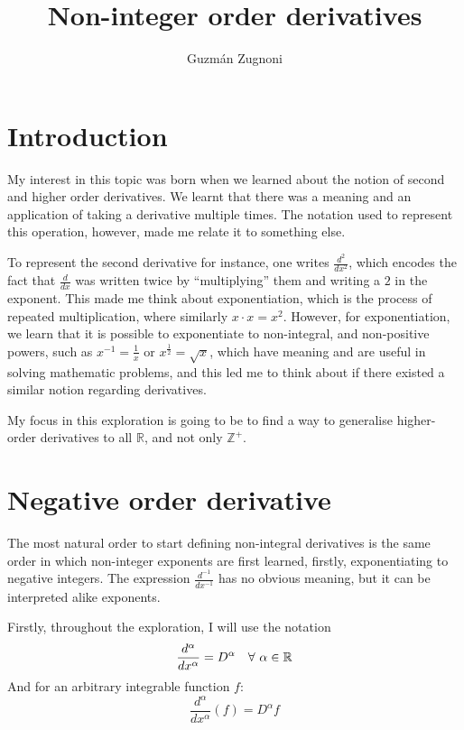 \documentclass{article}
\author{Guzmán Zugnoni}
\title{Non-integer order derivatives}
\renewcommand{\maketitle}{
\begin{center}
	\Huge\textbf \thetitle
\end{center}
}
\def\squad{\hskip2\fontdimen3\font}
\begin{document}
\maketitle

\newpage

\tableofcontents

\newpage

\section{Introduction}

My interest in this topic was born when we learned about the notion of second
and higher order derivatives. We learnt that there was a meaning and an
application of taking a derivative multiple times. The notation used to
represent this operation, however, made me relate it to something else.

To represent the second derivative for instance, one writes $\frac{d^2}{dx^2}$,
which encodes the fact that $\frac{d}{dx}$ was written twice by ``multiplying''
them and writing a $2$ in the exponent. This made me think about
exponentiation, which is the process of repeated multiplication, where
similarly $x \cdot x = x^2$. However, for exponentiation, we learn that it is
possible to exponentiate to non-integral, and non-positive powers, such as
$x^{-1}=\frac{1}{x}$ or $x^\frac{1}{2} = \sqrt{x}$, which have meaning and are
useful in solving mathematic problems, and this led me to think about if there
existed a similar notion regarding derivatives.

My focus in this exploration is going to be to find a way to generalise
higher-order derivatives to all $\mathbb{R}$, and not only $\mathbb{Z}^{+}$.

\section{Negative order derivative}

The most natural order to start defining non-integral derivatives is the same
order in which non-integer exponents are first learned,
firstly, exponentiating to negative integers. The expression
$\frac{d^{-1}}{dx^{-1}}$ has no obvious meaning, but it can be interpreted
alike exponents.

Firstly, throughout the exploration, I will use the notation
$$\frac{d^\alpha}{dx^\alpha}=D^\alpha \quad \forall \squad \alpha \in
\mathbb{R}$$
And for an arbitrary integrable function $f$:
$$\frac{d^\alpha}{dx^\alpha}\left(f\right) = D^\alpha f$$
\end{document}

